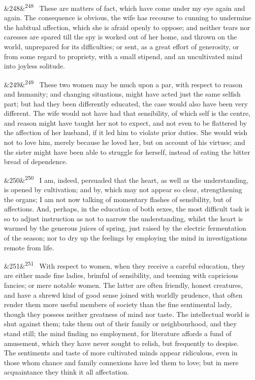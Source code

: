 \documentclass[12pt]{article}
\newcommand{\para}[1][]{\par\noindent\ifx&#1&\else\textsuperscript{\footnotesize #1}~\fi}
\begin{document}
\para[248] These are matters of fact, which have come under my eye again and again. The consequence is obvious, the wife has recourse to cunning to undermine the habitual affection, which she is afraid openly to oppose; and neither tears nor caresses are spared till the spy is worked out of her home, and thrown on the world, unprepared for its difficulties; or sent, as a great effort of generosity, or from some regard to propriety, with a small stipend, and an uncultivated mind into joyless solitude.

\para[249] These two women may be much upon a par, with respect to reason and humanity; and changing situations, might have acted just the same selfish part; but had they been differently educated, the case would also have been very different. The wife would not have had that sensibility, of which self is the centre, and reason might have taught her not to expect, and not even to be flattered by the affection of her husband, if it led him to violate prior duties. She would wish not to love him, merely because he loved her, but on account of his virtues; and the sister might have been able to struggle for herself, instead of eating the bitter bread of dependence.

\para[250] I am, indeed, persuaded that the heart, as well as the understanding, is opened by cultivation; and by, which may not appear so clear, strengthening the organs; I am not now talking of momentary flashes of sensibility, but of affections. And, perhaps, in the education of both sexes, the most difficult task is so to adjust instruction as not to narrow the understanding, whilst the heart is warmed by the generous juices of spring, just raised by the electric fermentation of the season; nor to dry up the feelings by employing the mind in investigations remote from life.

\para[251] With respect to women, when they receive a careful education, they are either made fine ladies, brimful of sensibility, and teeming with capricious fancies; or mere notable women. The latter are often friendly, honest creatures, and have a shrewd kind of good sense joined with worldly prudence, that often render them more useful members of society than the fine sentimental lady, though they possess neither greatness of mind nor taste. The intellectual world is shut against them; take them out of their family or neighbourhood, and they stand still; the mind finding no employment, for literature affords a fund of amusement, which they have never sought to relish, but frequently to despise. The sentiments and taste of more cultivated minds appear ridiculous, even in those whom chance and family connexions have led them to love; but in mere acquaintance they think it all affectation.
\end{document}
